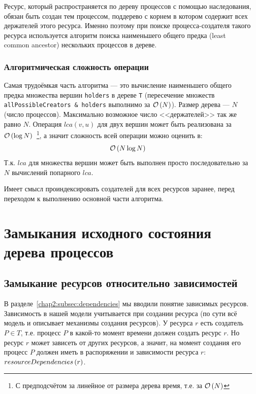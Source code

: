Ресурс, который распространяется по дереву процессов с помощью наследования, обязан быть создан тем процессом,
поддерево с корнем в котором содержит всех держателей этого ресурса. Именно поэтому при поиске процесса-создателя
такого ресурса используется алгоритм поиска наименьшего общего предка (least common ancestor) нескольких процессов в дереве.

\subsubsection*{Алгоритмическая сложность операции}

Самая трудоёмкая часть алгоритма --- это вычисление наименьшего общего предка множества вершин \texttt{holders} в дереве \texttt{T} (пересечение множеств \texttt{allPossibleCreators \& holders} выполнимо за $\mathcal{O}\left(N\right)$). Размер дерева --- $N$ (число процессов). Максимально возможное число <<держателей>> так же равно $N$. Операция $lca(v, u)$ для двух вершин может быть реализована за $\mathcal{O}\left(\log{N}\right)$~\footnote{С предподсчётом за линейное от размера дерева время, т.е. за $\mathcal{O}\left(N\right)$}, а значит сложность всей операции можно оценить в:
\begin{equation}
\mathcal{O}\left(N\log{N}\right)
\end{equation}
Т.к. $lca$ для множества вершин может быть выполнен просто последовательно за $N$ вычислений попарного $lca$.

Имеет смысл проиндексировать создателей для всех ресурсов заранее, перед переходом к выполнению основной части алгоритма.

\section{Замыкания исходного состояния дерева процессов}
\label{chap2:sec:closures}

\subsection{Замыкание ресурсов относительно зависимостей}

В разделе~\ref{chap2:subsec:dependencies} мы вводили понятие зависимых ресурсов. Зависимость в нашей модели учитывается при создании ресурса (по сути всё модель и описывает механизмы создания ресурсов). У ресурса $r$ есть создатель $P \in T$, т.е. процесс $P$ в какой-то момент времени должен создать ресурс $r$. Но ресурс $r$ может зависеть от других ресурсов, а значит, на момент создания его процесс $P$ должен иметь в распоряжении и зависимости ресурса $r$: $resourceDependencies\left( r \right)$.

